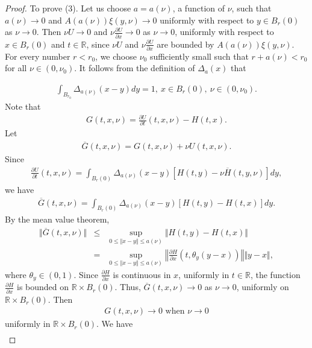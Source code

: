 \documentclass[10pt,a4paper]{amsart}
\newcommand{\bb}[1]{{\mathbb{#1}}}
\begin{document}
\begin{proof}
To prove (3). Let us choose $a=a(\nu)$, a function of $\nu$, such that $a(\nu)\rightarrow 0$ and $A(a(\nu))\xi(y,\nu)\rightarrow 0$ uniformly with respect to $y\in B_r(0)$ as $\nu\rightarrow 0$.  
Then $\nu U\rightarrow 0$ and $\nu \frac{\partial U}{\partial x}\rightarrow 0$ as $\nu \rightarrow 0$, uniformly with respect to $x\in B_r(0)$ and $t\in \mathbb{R}$, since $\nu U$ and $\nu \frac{\partial U}{\partial x}$ are bounded by $A(a(\nu))\xi(y,\nu)$.  
For every number $r<r_0$, we choose $\nu_0$ sufficiently small such that $r+a(\nu)<r_0$ for all $\nu\in(0,\nu_0)$.  
It follows from the definition of $\Delta_a(x)$ that

\begin{eqnarray*}
\int_{B_{r_{0}}} \Delta_{a(\nu)}(x-y)dy=1,\ x\in B_{r}(0),\ \nu\in(0,\nu_0).
\end{eqnarray*}
Note that
\begin{eqnarray*}
G(t,x,\nu)=\frac{\partial U}{\partial t}(t,x,\nu)	-H(t,x).
\end{eqnarray*}
Let
\begin{eqnarray*}
\overline{G}(t,x,\nu)= G(t,x,\nu)+\nu U(t,x,\nu).
\end{eqnarray*}
Since
\begin{eqnarray*}
\frac{\partial U}{\partial t}(t,x,\nu)=\int_{B_{r}(0)}\Delta_{a(\nu)}(x-y)[H(t,y)-\nu\overline{H}(t,y,\nu)]dy,
\end{eqnarray*}
we have 
\begin{eqnarray*}
\overline{G}(t,x,\nu)=\int_{B_{r}(0)}\Delta_{a(\nu)}(x-y)[H(t,y)-H(t,x)]dy.
\end{eqnarray*}
By the mean value theorem,
\begin{eqnarray*}
\Vert\overline{G}(t,x,\nu) \Vert &\leq& \sup_{0\leq\Vert x-y\Vert\leq a(\nu)} \Vert H(t,y)-H(t,x) \Vert \\
&=& \sup_{0\leq\Vert x-y\Vert\leq a(\nu)} \left\Vert \frac{\partial H}{\partial x}(t, \theta_{y} (y-x)) \right\Vert \Vert y-x\Vert,
\end{eqnarray*}
where $\theta_y \in (0,1)$. Since $\frac{\partial H}{\partial x}$ is continuous in $x$, uniformly in $t\in\mathbb{R}$, the function $\frac{\partial H}{\partial x}$ is bounded on $\mathbb{R}\times B_{r}(0)$.  
Thus, $\overline{G}(t,x,\nu)\rightarrow 0$ as $\nu\rightarrow 0$, uniformly on $\mathbb{R}\times B_{r}(0)$. Then
\begin{eqnarray*}
G(t,x,\nu)\rightarrow 0 \mbox{  when } \nu\rightarrow 0
\end{eqnarray*}
uniformly in $\bb{R}\times B_{r}(0)$. 
We have
\begin{eqnarray*}

\end{eqnarray*}
\end{proof}
\end{document}
